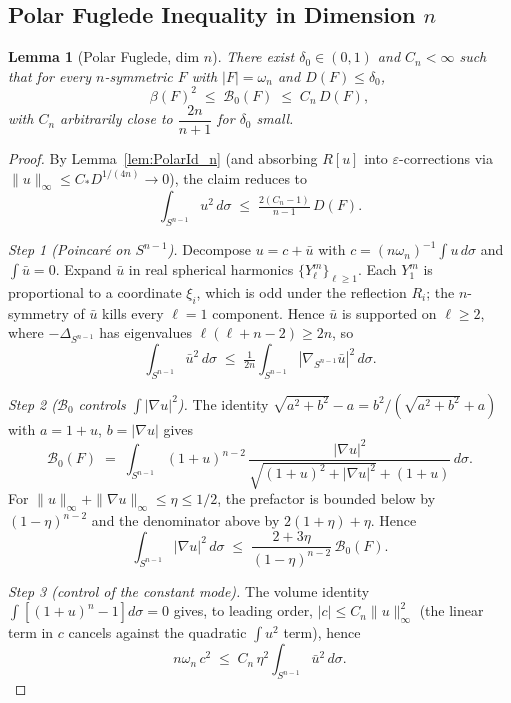 \documentclass[11pt]{article}
\newtheorem{lemma}[theorem]{Lemma}
\newcommand{\B}{\mathcal{B}}
\newcommand{\eps}{\varepsilon}
\begin{document}
\subsection{Polar Fuglede Inequality in Dimension $n$}
\begin{lemma}[Polar Fuglede, dim $n$] \label{lem:Fug_n}
There exist $\delta_0\in(0,1)$ and $C_n<\infty$ such that for every $n$-symmetric $F$ with $|F|=\omega_n$ and $D(F)\le\delta_0$,
\[
   \beta(F)^2 \;\le\; \B_0(F) \;\le\; C_n\,D(F),
\]
with $C_n$ arbitrarily close to $\dfrac{2n}{n+1}$ for $\delta_0$ small.
\end{lemma}
\begin{proof}
By Lemma~\ref{lem:PolarId_n} (and absorbing $R[u]$ into $\eps$-corrections via $\|u\|_\infty \le C_* D^{1/(4n)} \to 0$), the claim reduces to
\[
   \int_{S^{n-1}}\!u^2\,d\sigma \;\le\; \tfrac{2(C_n - 1)}{n-1}\,D(F).
\]

\smallskip
\emph{Step 1 (Poincar\'e on $S^{n-1}$).} Decompose $u = c + \bar u$ with $c = (n\omega_n)^{-1}\int u\,d\sigma$ and $\int \bar u = 0$. Expand $\bar u$ in real spherical harmonics $\{Y_\ell^m\}_{\ell\ge 1}$. Each $Y_1^m$ is proportional to a coordinate $\xi_i$, which is odd under the reflection $R_i$; the $n$-symmetry of $\bar u$ kills every $\ell=1$ component. Hence $\bar u$ is supported on $\ell\ge 2$, where $-\Delta_{S^{n-1}}$ has eigenvalues $\ell(\ell+n-2) \ge 2n$, so
\[
   \int_{S^{n-1}}\!\bar u^2\,d\sigma \;\le\; \tfrac{1}{2n}\!\int_{S^{n-1}}\!|\nabla_{S^{n-1}}\bar u|^2\,d\sigma. \tag{$P_n$}
\]

\smallskip
\emph{Step 2 ($\B_0$ controls $\int|\nabla u|^2$).} The identity $\sqrt{a^2+b^2} - a = b^2/(\sqrt{a^2+b^2}+a)$ with $a=1+u$, $b=|\nabla u|$ gives
\[
   \B_0(F) \;=\; \int_{S^{n-1}} (1+u)^{n-2}\,\frac{|\nabla u|^2}{\sqrt{(1+u)^2+|\nabla u|^2} + (1+u)}\,d\sigma.
\]
For $\|u\|_\infty + \|\nabla u\|_\infty \le \eta \le 1/2$, the prefactor is bounded below by $(1-\eta)^{n-2}$ and the denominator above by $2(1+\eta) + \eta$. Hence
\[
   \int_{S^{n-1}}|\nabla u|^2\,d\sigma \;\le\; \frac{2+3\eta}{(1-\eta)^{n-2}}\,\B_0(F). \tag{$U_n$}
\]

\smallskip
\emph{Step 3 (control of the constant mode).} The volume identity $\int[(1+u)^n - 1]d\sigma = 0$ gives, to leading order, $|c| \le C_n\|u\|_\infty^2$ (the linear term in $c$ cancels against the quadratic $\int u^2$ term), hence
\[
   n\omega_n\,c^2 \;\le\; C_n\,\eta^2 \!\int_{S^{n-1}}\!\bar u^2\,d\sigma. \tag{$C_n$}
\]


\end{proof}
\end{document}
